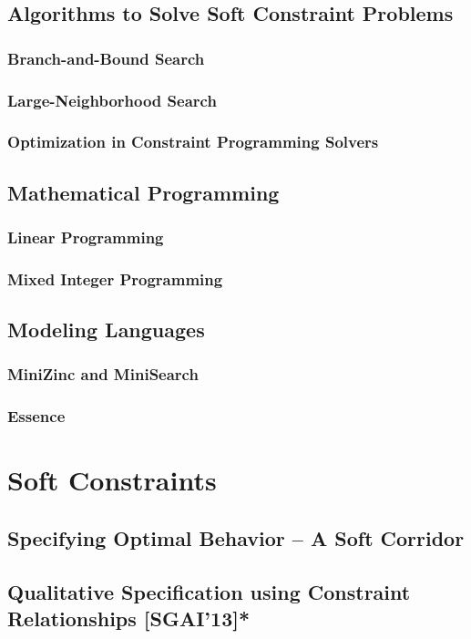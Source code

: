 \documentclass[10pt,a4paper]{book}
\begin{document}
\section{Algorithms to Solve Soft Constraint Problems }
\subsection{Branch-and-Bound Search}
\subsection{Large-Neighborhood Search}
\subsection{Optimization in Constraint Programming Solvers}

\section{Mathematical Programming}
\subsection{Linear Programming}
\subsection{Mixed Integer Programming}

\section{Modeling Languages}
\subsection{MiniZinc and MiniSearch}
\subsection{Essence}

\chapter{Soft Constraints}
\section{Specifying Optimal Behavior -- A Soft Corridor}

\section{Qualitative Specification using Constraint Relationships [SGAI'13]*}
\end{document}
